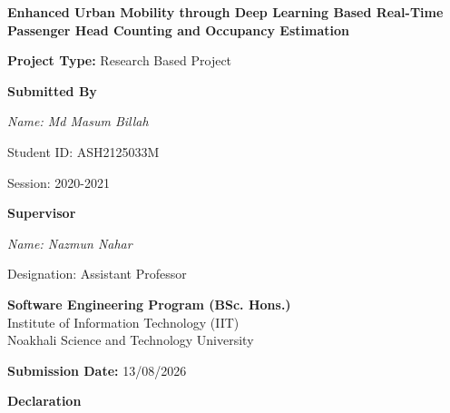 \documentclass[12pt,a4paper]{report}
\begin{document}
\begin{center}

\vspace{1cm}

{\LARGE \textbf{Enhanced Urban Mobility through Deep Learning Based Real-Time Passenger Head Counting and Occupancy Estimation }}

\vspace{1.5cm}

{\large \textbf{Project Type:} Research Based Project}

\vspace{2.5cm}

\textbf{Submitted By}

\vspace{1cm}

{\large \textit{Name: Md Masum Billah}}

\vspace{0.3cm}

Student ID: ASH2125033M

\vspace{0.3cm}

Session: 2020-2021

\vspace{2.5cm}

\textbf{Supervisor }

\vspace{0.5cm}

{\large \textit{Name: 
Nazmun Nahar}}

\vspace{0.3cm}

Designation: Assistant Professor

\vspace{3cm}

\textbf{Software Engineering Program (BSc. Hons.)}\\
Institute of Information Technology (IIT)\\
Noakhali Science and Technology University

\vspace{2.5cm}

\textbf{Submission Date:} 13/08/2026

\end{center}


\newpage
{}
{}
\thispagestyle{empty}
\begin{center}
    \Large\textbf{Declaration}
\end{center}
\vspace{1cm}
\end{document}
